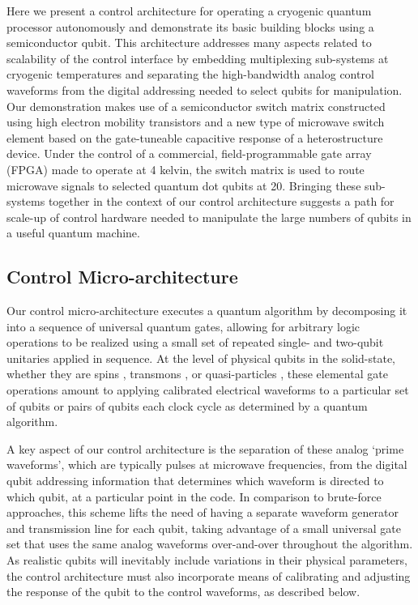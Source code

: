 Here we present a control architecture for operating a cryogenic quantum processor autonomously and demonstrate its basic building blocks using a semiconductor qubit. This architecture addresses many aspects related to scalability of the control interface by embedding multiplexing sub-systems at cryogenic temperatures and separating the high-bandwidth analog control waveforms from the digital addressing needed to select qubits for manipulation. Our demonstration makes use of a semiconductor switch matrix constructed using high electron mobility transistors and a new type of microwave switch element based on the gate-tuneable capacitive response of a heterostructure device. Under the control of a commercial, field-programmable gate array (FPGA) made to operate at 4 kelvin, the switch matrix is used to route microwave signals to selected quantum dot qubits at \SI{20}{\mk}. Bringing these sub-systems together in the context of our control architecture suggests a path for scale-up of control hardware needed to manipulate the large numbers of qubits in a useful quantum machine.

\subsection{Control Micro-architecture}
Our control micro-architecture executes a quantum algorithm by decomposing it into a sequence of universal quantum gates, allowing for arbitrary logic operations to be realized using a small set of repeated single- and two-qubit unitaries applied in sequence. At the level of physical qubits in the solid-state, whether they are spins \cite{Shulman202}, transmons \cite{PhysRevLett.107.240501,Devoret1169}, or quasi-particles \cite{Mourik1003}, these elemental gate operations amount to applying calibrated electrical waveforms to a particular set of qubits or pairs of qubits each clock cycle as determined by a quantum algorithm.

A key aspect of our control architecture is the separation of these analog `prime waveforms', which are typically pulses at microwave frequencies, from the digital qubit addressing information that determines which waveform is directed to which qubit, at a particular point in the code. In comparison to brute-force approaches, this scheme lifts the need of having a separate waveform generator and transmission line for each qubit, taking advantage of a small universal gate set that uses the same analog waveforms over-and-over throughout the algorithm. As realistic qubits will inevitably include variations in their physical parameters, the control architecture must also incorporate means of calibrating and adjusting the response of the qubit to the control waveforms, as described below.

